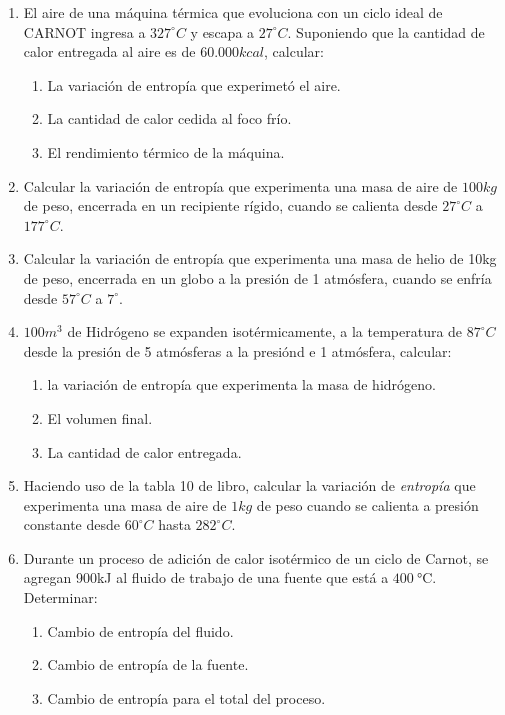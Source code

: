 \documentclass[../main]{subfiles}
\begin{document}
\begin{enumerate}
    \item El aire de una máquina térmica que evoluciona con un ciclo ideal de CARNOT ingresa a $327^\circ C$ y escapa a $27^\circ C$.
    Suponiendo que la cantidad de calor entregada al aire es de $60.000kcal$, calcular:
    \begin{enumerate}
        \item La variación de entropía que experimetó el aire.
        \item La cantidad de calor cedida al foco frío.
        \item El rendimiento térmico de la máquina.
    \end{enumerate}
    \item Calcular la variación de entropía que experimenta una masa de aire de $100kg$ de peso, encerrada en un recipiente rígido, cuando se calienta desde $27^\circ C$ a $177^\circ C$.
    \item Calcular la variación de entropía que experimenta una masa de helio de 10kg de peso, encerrada en un globo a la presión de 1 atmósfera, cuando se enfría desde $57^\circ C$ a $7^\circ$.
    \item $100 m^3$ de Hidrógeno se expanden isotérmicamente, a la temperatura de $87^\circ C$ desde la presión de 5 atmósferas a la presiónd e 1 atmósfera, calcular:
    \begin{enumerate}
        \item la variación de entropía que experimenta la masa de hidrógeno.
        \item El volumen final.
        \item La cantidad de calor entregada.
    \end{enumerate}
    \item Haciendo uso de la tabla 10 de libro, calcular la variación de \emph{entropía} que experimenta una masa de aire de $1kg$ de peso cuando se calienta a presión constante desde $60^\circ C$ hasta $282^\circ C$.
    \item Durante un proceso de adición de calor isotérmico de un ciclo de Carnot, se agregan 900kJ al fluido de trabajo de una fuente que está a $\SI{400}{\celsius}$. Determinar:
    \begin{enumerate}
        \item Cambio de entropía del fluido.
        \item Cambio de entropía de la fuente.
        \item Cambio de entropía para el total del proceso.

\end{enumerate}
\end{enumerate}
\end{document}
